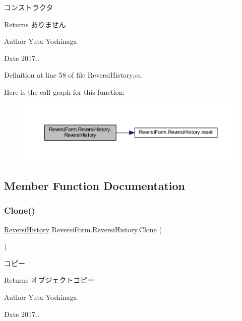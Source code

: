 コンストラクタ 

\begin{DoxyReturn}{Returns}
ありません 
\end{DoxyReturn}
\begin{DoxyAuthor}{Author}
Yuta Yoshinaga 
\end{DoxyAuthor}
\begin{DoxyDate}{Date}
2017.. 
\end{DoxyDate}


Definition at line 58 of file Reversi\+History.\+cs.

Here is the call graph for this function\+:\nopagebreak
\begin{figure}[H]
\begin{center}
\leavevmode
\includegraphics[width=350pt]{class_reversi_form_1_1_reversi_history_aef9c390a68d81077b70bc6181587106b_cgraph}
\end{center}
\end{figure}


\subsection{Member Function Documentation}
\mbox{\label{class_reversi_form_1_1_reversi_history_abfbbd1ca8654256ba743c3f07b573484}} 
\subsubsection{\texorpdfstring{Clone()}{Clone()}}
{\footnotesize\ttfamily \hyperlink{class_reversi_form_1_1_reversi_history}{Reversi\+History} Reversi\+Form.\+Reversi\+History.\+Clone (\begin{DoxyParamCaption}{ }\end{DoxyParamCaption})}



コピー 

\begin{DoxyReturn}{Returns}
オブジェクトコピー 
\end{DoxyReturn}
\begin{DoxyAuthor}{Author}
Yuta Yoshinaga 
\end{DoxyAuthor}
\begin{DoxyDate}{Date}
2017.. 
\end{DoxyDate}


